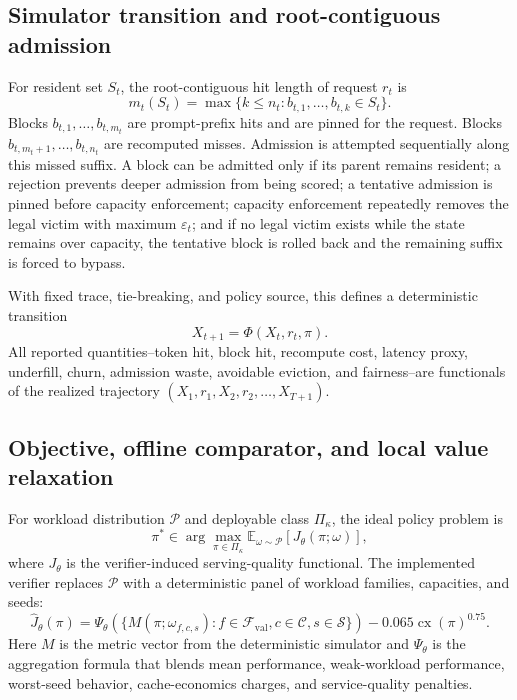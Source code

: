 \documentclass[11pt]{article}
\begin{document}
\subsection{Simulator transition and root-contiguous admission}

For resident set \(S_t\), the root-contiguous hit length of request \(r_t\) is
\begin{equation}
  m_t(S_t)=\max\{k\le n_t:b_{t,1},\ldots,b_{t,k}\in S_t\}.
\end{equation}
Blocks \(b_{t,1},\ldots,b_{t,m_t}\) are prompt-prefix hits and are pinned for the
request.  Blocks \(b_{t,m_t+1},\ldots,b_{t,n_t}\) are recomputed misses.  Admission is
attempted sequentially along this missed suffix.  A block can be admitted only if its
parent remains resident; a rejection prevents deeper admission from being scored;
a tentative admission is pinned before capacity enforcement; capacity enforcement
repeatedly removes the legal victim with maximum \(\varepsilon_t\); and if no legal
victim exists while the state remains over capacity, the tentative block is rolled back
and the remaining suffix is forced to bypass.

With fixed trace, tie-breaking, and policy source, this defines a deterministic
transition
\begin{equation}
  X_{t+1}=\Phi(X_t,r_t,\pi).
\end{equation}
All reported quantities--token hit, block hit, recompute cost, latency proxy,
underfill, churn, admission waste, avoidable eviction, and fairness--are functionals of
the realized trajectory
\((X_1,r_1,X_2,r_2,\ldots,X_{T+1})\).

\subsection{Objective, offline comparator, and local value relaxation}

For workload distribution \(\mathcal P\) and deployable class \(\Pi_\kappa\), the ideal
policy problem is
\begin{equation}
  \pi^*\in\arg\max_{\pi\in\Pi_\kappa}
  \mathbb E_{\omega\sim\mathcal P}[J_\theta(\pi;\omega)],
  \label{eq:ideal-regime-objective}
\end{equation}
where \(J_\theta\) is the verifier-induced serving-quality functional.  The implemented
verifier replaces \(\mathcal P\) with a deterministic panel of workload families,
capacities, and seeds:
\begin{equation}
  \widehat J_\theta(\pi)=
  \Psi_\theta\left(\{M(\pi;\omega_{f,c,s})
  : f\in\mathcal F_{\mathrm{val}}, c\in\mathcal C, s\in\mathcal S\}\right)
  -0.065\operatorname{cx}(\pi)^{0.75}.
  \label{eq:empirical-regime-objective}
\end{equation}
Here \(M\) is the metric vector from the deterministic simulator and \(\Psi_\theta\) is
the aggregation formula that blends mean performance, weak-workload performance,
worst-seed behavior, cache-economics charges, and service-quality penalties.
\end{document}
